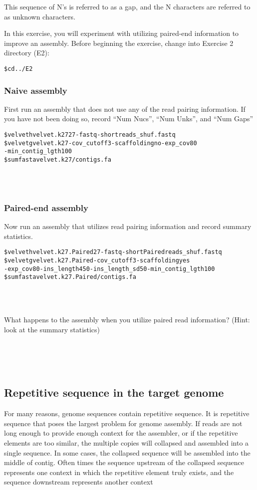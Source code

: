 \documentclass[11pt,a4paper]{scrartcl}
\newcommand{\twolines}{
~\\
~\\
~\\
\noindent
}
\newcommand{\oneline}{
~\\
~\\
\noindent
}
\begin{document}
\noindent
This sequence of N's is referred to as a gap, and the N characters are referred
to as unknown characters. 

\noindent
In this exercise, you will experiment with utilizing paired-end information to
improve an assembly. Before beginning the exercise, change into Exercise 2
directory (E2):

\begin{alltt}
    \$ cd ../E2
\end{alltt}

\subsubsection{Naive assembly}
First run an assembly that does not use any of the read pairing information. If
you have not been doing so, record ``Num Nucs'', ``Num Unks'', and ``Num Gaps''
\begin{alltt}
    \$ velveth velvet.k27 27 -fastq -short reads_shuf.fastq
    \$ velvetg velvet.k27 -cov_cutoff 3 -scaffolding no -exp_cov 80 
      -min_contig_lgth 100
    \$ sumfasta velvet.k27/contigs.fa
\end{alltt}
\oneline

\subsubsection{Paired-end assembly}
Now run an assembly that utilizes read pairing information and record summary statistics.
\begin{alltt}
    \$ velveth velvet.k27.Paired 27 -fastq -shortPaired reads_shuf.fastq
    \$ velvetg velvet.k27.Paired -cov_cutoff 3 -scaffolding yes 
      -exp_cov 80 -ins_length 450 -ins_length_sd 50 -min_contig_lgth 100
    \$ sumfasta velvet.k27.Paired/contigs.fa
\end{alltt}
\oneline
What happens to the assembly when you utilize paired read information? (Hint: look at the summary statistics)
\twolines


\subsection{Repetitive sequence in the target genome}

For many reasons, genome sequences contain repetitive sequence. It is
repetitive sequence that poses the largest problem for genome assembly. If
reads are not long enough to provide enough context for the assembler, or if
the repetitive elements are too similar, the multiple copies will collapsed and
assembled into a single sequence. In some cases, the collapsed sequence will be
assembled into the middle of contig. Often times the sequence upstream of the
collapsed sequence represents one context in which the repetitive element truly
exists, and the sequence downstream represents another context
\end{document}
